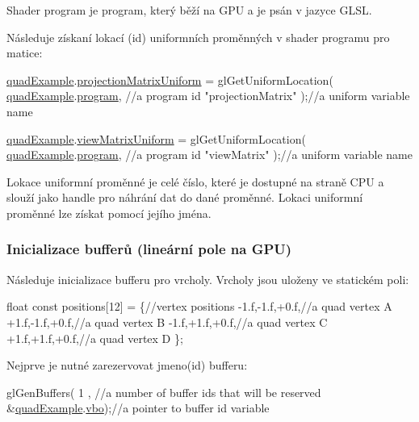 Shader program je program, který běží na G\-P\-U a je psán v jazyce G\-L\-S\-L.\par
 Následuje získaní lokací (id) uniformních proměnných v shader programu pro matice\-: 
\begin{DoxyCodeInclude}
  \hyperlink{quadExample_8c_ad961415145a9c30bd9846d4a278cc63a}{quadExample}.\hyperlink{structQuadExampleVariables_a38a1023cb8ee3692e195ea574e43c51a}{projectionMatrixUniform} = glGetUniformLocation(
      \hyperlink{quadExample_8c_ad961415145a9c30bd9846d4a278cc63a}{quadExample}.\hyperlink{structQuadExampleVariables_a63971781ff860bd201886926f943ba78}{program}, \textcolor{comment}{//a program id}
      \textcolor{stringliteral}{"projectionMatrix"} );\textcolor{comment}{//a uniform variable name}

  \hyperlink{quadExample_8c_ad961415145a9c30bd9846d4a278cc63a}{quadExample}.\hyperlink{structQuadExampleVariables_a9c505e0a089ecd495b18550309ebab77}{viewMatrixUniform} = glGetUniformLocation(
      \hyperlink{quadExample_8c_ad961415145a9c30bd9846d4a278cc63a}{quadExample}.\hyperlink{structQuadExampleVariables_a63971781ff860bd201886926f943ba78}{program}, \textcolor{comment}{//a program id}
      \textcolor{stringliteral}{"viewMatrix"}       );\textcolor{comment}{//a uniform variable name}
\end{DoxyCodeInclude}
Lokace uniformní proměnné je celé číslo, které je dostupné na straně C\-P\-U a slouží jako handle pro náhrání dat do dané proměnné. Lokaci uniformní proměnné lze získat pomocí jejího jména. \hypertarget{quadExample.c_Buffers}{}\subsubsection{Inicializace bufferů (lineární pole na G\-P\-U)}\label{quadExample.c_Buffers}
Následuje inicializace bufferu pro vrcholy. Vrcholy jsou uloženy ve statickém poli\-: 
\begin{DoxyCodeInclude}
  \textcolor{keywordtype}{float} \textcolor{keyword}{const} positions[12] = \{\textcolor{comment}{//vertex positions}
    -1.f,-1.f,+0.f,\textcolor{comment}{//a quad vertex A}
    +1.f,-1.f,+0.f,\textcolor{comment}{//a quad vertex B}
    -1.f,+1.f,+0.f,\textcolor{comment}{//a quad vertex C}
    +1.f,+1.f,+0.f,\textcolor{comment}{//a quad vertex D}
  \};
\end{DoxyCodeInclude}
Nejprve je nutné zarezervovat jmeno(id) bufferu\-: 
\begin{DoxyCodeInclude}
  glGenBuffers(
      1               , \textcolor{comment}{//a number of buffer ids that will be reserved}
      &\hyperlink{quadExample_8c_ad961415145a9c30bd9846d4a278cc63a}{quadExample}.\hyperlink{structQuadExampleVariables_a69515fd546272c117e14f784221f6412}{vbo});\textcolor{comment}{//a pointer to buffer id variable}
\end{DoxyCodeInclude}
